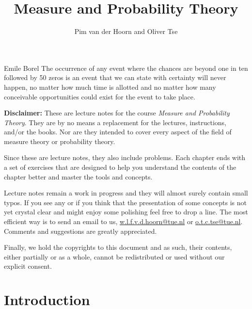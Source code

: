 \documentclass{lecturenotes}
\begin{document}
\begin{titlepage}
    \title{Measure and Probability Theory}
    \author{Pim van der Hoorn and Oliver Tse}
    \maketitle
\end{titlepage}

\begin{chapquote}[30pt]{Emile Borel}
The occurrence of any event where the chances are beyond one in ten followed by 50 zeros is an event that we can state with certainty will never happen, no matter how much time is allotted and no matter how many conceivable opportunities could exist for the event to take place.
\end{chapquote}
\vfill
\noindent\textbf{Disclaimer:}
These are lecture notes for the course \emph{Measure and Probability Theory}. They are by no means a replacement for the lectures, instructions, and/or the books. Nor are they intended to cover every aspect of the field of measure theory or probability theory.

Since these are lecture notes, they also include problems. Each chapter ends with a set of exercises that are designed to help you understand the contents of the chapter better and master the tools and concepts.

Lecture notes remain a work in progress and they will almost surely contain small typos. If you see any or if you think that the presentation of some concepts is not yet crystal clear and might enjoy some polishing feel free to drop a line. The most efficient way is to send an email to us, \href{mailto:w.l.f.v.d.hoorn@tue.nl}{w.l.f.v.d.hoorn@tue.nl} or \href{mailto:o.t.c.tse@tue.nl}{o.t.c.tse@tue.nl}. Comments and suggestions are greatly appreciated.

Finally, we hold the copyrights to this document and as such, their contents, either partially or as a whole, cannot be redistributed or used without our explicit consent.

\newpage

\tableofcontents

\chapter{Introduction}
\label{chapter:introduction}

\end{document}
